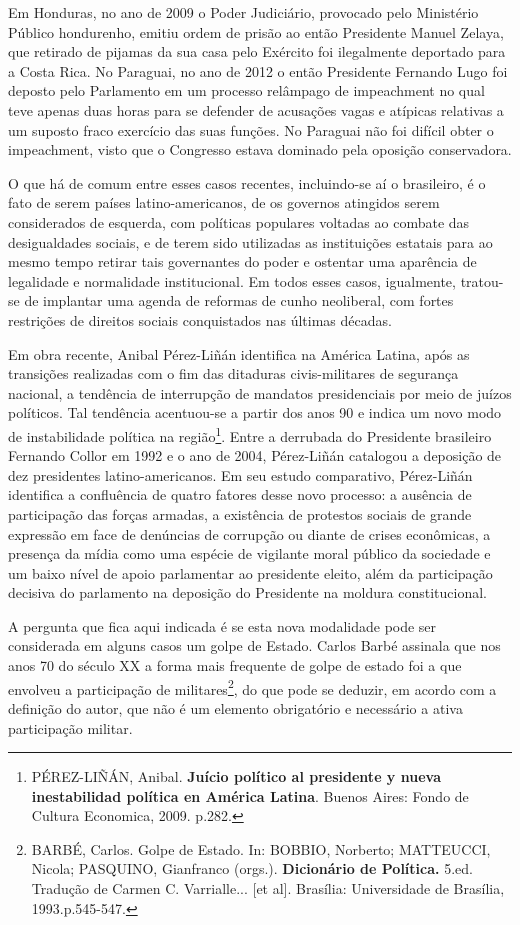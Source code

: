 Em Honduras, no ano de 2009 o Poder Judiciário, provocado pelo
Ministério Público hondurenho, emitiu ordem de prisão ao então
Presidente Manuel Zelaya, que retirado de pijamas da sua casa pelo
Exército foi ilegalmente deportado para a Costa Rica. No Paraguai, no
ano de 2012 o então Presidente Fernando Lugo foi deposto pelo Parlamento
em um processo relâmpago de impeachment no qual teve apenas duas horas
para se defender de acusações vagas e atípicas relativas a um suposto
fraco exercício das suas funções. No Paraguai não foi difícil obter o
impeachment, visto que o Congresso estava dominado pela oposição
conservadora.

O que há de comum entre esses casos recentes, incluindo-se aí o
brasileiro, é o fato de serem países latino-americanos, de os governos
atingidos serem considerados de esquerda, com políticas populares
voltadas ao combate das desigualdades sociais, e de terem sido
utilizadas as instituições estatais para ao mesmo tempo retirar tais
governantes do poder e ostentar uma aparência de legalidade e
normalidade institucional. Em todos esses casos, igualmente, tratou-se
de implantar uma agenda de reformas de cunho neoliberal, com fortes
restrições de direitos sociais conquistados nas últimas décadas.

Em obra recente, Anibal Pérez-Liñán identifica na América Latina, após
as transições realizadas com o fim das ditaduras civis-militares de
segurança nacional, a tendência de interrupção de mandatos presidenciais
por meio de juízos políticos. Tal tendência acentuou-se a partir dos
anos 90 e indica um novo modo de instabilidade política na
região\footnote{PÉREZ-LIÑÁN, Anibal. \textbf{Juício político al
  presidente y nueva inestabilidad política en América Latina}. Buenos
  Aires: Fondo de Cultura Economica, 2009. p.282.}. Entre a derrubada do
Presidente brasileiro Fernando Collor em 1992 e o ano de 2004,
Pérez-Liñán catalogou a deposição de dez presidentes latino-americanos.
Em seu estudo comparativo, Pérez-Liñán identifica a confluência de
quatro fatores desse novo processo: a ausência de participação das
forças armadas, a existência de protestos sociais de grande expressão em
face de denúncias de corrupção ou diante de crises econômicas, a
presença da mídia como uma espécie de vigilante moral público da
sociedade e um baixo nível de apoio parlamentar ao presidente eleito,
além da participação decisiva do parlamento na deposição do Presidente
na moldura constitucional.

A pergunta que fica aqui indicada é se esta nova modalidade pode ser
considerada em alguns casos um golpe de Estado. Carlos Barbé assinala
que nos anos 70 do século XX a forma mais frequente de golpe de estado
foi a que envolveu a participação de militares\footnote{BARBÉ, Carlos.
  Golpe de Estado. In: BOBBIO, Norberto; MATTEUCCI, Nicola; PASQUINO,
  Gianfranco (orgs.). \textbf{Dicionário de Política.} 5.ed. Tradução de
  Carmen C. Varrialle... {[}et al{]}. Brasília: Universidade de
  Brasília, 1993.p.545-547.}, do que pode se deduzir, em acordo com a
definição do autor, que não é um elemento obrigatório e necessário a
ativa participação militar.

